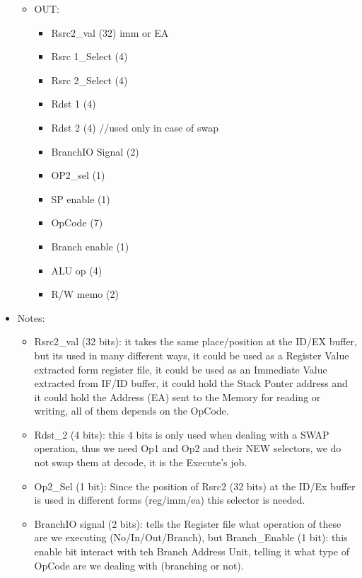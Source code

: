 \documentclass[12pt]{report}
\begin{document}
\begin{itemize}
\begin{itemize}
        \item OUT:
        \begin{itemize}
            \item Rsrc2_val (32) imm or EA
            \item Rsrc 1_Select (4)
            \item Rsrc 2_Select (4)
            \item Rdst 1 (4)
            \item Rdst 2 (4) //used only in case of swap
            \item BranchIO Signal (2)
            \item OP2_sel (1)
            \item SP enable (1)
            \item OpCode (7)
            \item Branch enable (1)
            \item ALU op (4)
            \item R/W memo (2)
        \end{itemize}
    \end{itemize}
    \item Notes:
    \begin{itemize}
        \item Rsrc2_val (32 bits): it takes the same place/position at the ID/EX buffer, but its used in many different ways, it could be used as a Register Value extracted form register file, it could be used as an Immediate Value extracted from IF/ID buffer, it could hold the Stack Ponter address and it could hold the Address (EA) sent to the Memory for reading or writing, all of them depends on the OpCode.
        \item Rdst_2 (4 bits): this 4 bits is only used when dealing with a SWAP operation, thus we need Op1 and Op2 and their NEW selectors, we do not swap them at decode, it is the Execute's job.
        \item Op2_Sel (1 bit): Since the position of Rsrc2 (32 bits) at the ID/Ex buffer is used in different forms (reg/imm/ea) this selector is needed.
        \item BranchIO signal (2 bits): tells the Register file what operation of these are we executing (No/In/Out/Branch), but Branch_Enable (1 bit): this enable bit interact with teh Branch Address Unit, telling it what type of OpCode are we dealing with (branching or not).
    \end{itemize}
    
\end{itemize}
\end{document}
